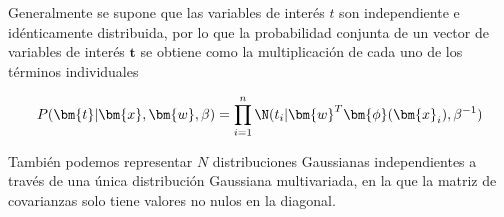 \documentclass[a4paper,10pt]{article}
\begin{document}
% 
% 
%     
%     
%       
% 

Generalmente se supone que las variables de inter\'es $t$ son independiente e id\'enticamente distribuida, por lo que la probabilidad conjunta de un vector de variables de inter\'es $\bm{t}$ se obtiene como la multiplicaci\'on de cada uno de los t\'erminos individuales

\begin{equation}
P(\bm{t} | \bm{x}, \bm{w}, \beta) = \prod_{i=1}^n \N(t_i | \bm{w}^T \bm{\phi}(\bm{x}_i) , \beta^{-1})
\end{equation}

% 
% 
% 
%     
%     
%       

Tambi\'en podemos representar $N$ distribuciones Gaussianas independientes a trav\'es de una \'unica distribuci\'on Gaussiana multivariada, en la que la matriz de covarianzas solo tiene valores no nulos en la diagonal.
\end{document}
